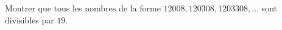 Montrer que tous les nombres de la forme $12008, 120308, 1203308, \ldots$ sont divisibles par $19$.
